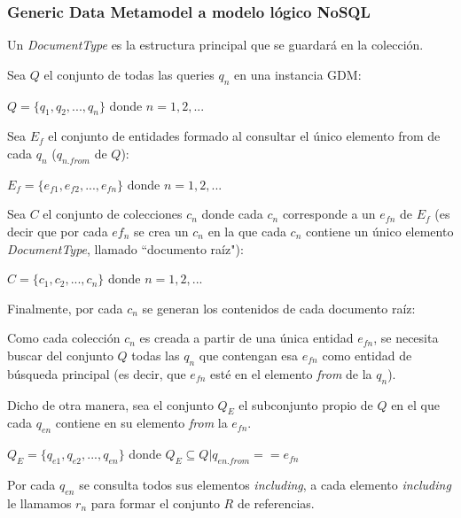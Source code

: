 \subsubsection{Generic Data Metamodel a modelo lógico NoSQL}

Un \textit{DocumentType} es la estructura principal que se guardará en la colección.


Sea $Q$ el conjunto de todas las queries $q_{n}$ en una instancia GDM:

\begin{center}
    $Q = \{q_{1}, q_{2},..., q_{n}\}$ donde $n=1,2,...$    
\end{center}

Sea $E_{f}$ el conjunto de entidades formado al consultar el único elemento from de cada $q_n$ ($q_{n.from}$ de $Q$): 

\begin{center}
    $ E_{f} = \{e_{f1},e_{f2},...,e_{fn}\} $ donde $n=1,2,...$    
\end{center}


Sea $C$ el conjunto de colecciones $c_{n}$ donde cada $c_{n}$ corresponde a un $e_{fn}$ de $E_{f}$ (es decir que por cada $ef_{n}$ se crea un $c_{n}$ en la que cada $c_{n}$ contiene un único elemento \textit{DocumentType}, llamado ``documento raíz"):

\begin{center}
    $C = \{ c_{1},c_{2},...,c_{n}\}$ donde $n=1,2,...$    
\end{center}

Finalmente, por cada $c_{n}$ se generan los contenidos de cada documento raíz:

Como cada colección $c_{n}$ es creada a partir de una única entidad $e_{fn}$, se necesita buscar del conjunto $Q$ todas las $q_{n}$ que contengan esa $e_{fn}$ como entidad de búsqueda principal (es decir, que $e_{fn}$ esté en el elemento \textit{from} de la $q_{n}$).


Dicho de otra manera, sea el conjunto $Q_{E}$ el subconjunto propio de $Q$ en el que cada $q_{en}$ contiene en su elemento \textit{from} la $e_{fn}$.
\begin{center}
    $Q_{E} = \{q_{e1},q_{e2},...,q_{en}\}$ donde $Q_{E} \subseteq Q  | q_{en.from} == e_{fn}$
\end{center}

Por cada $q_{en}$ se consulta todos sus elementos \textit{including}, a cada elemento \textit{including} le llamamos $r_{n}$ para formar el conjunto $R$ de referencias.

